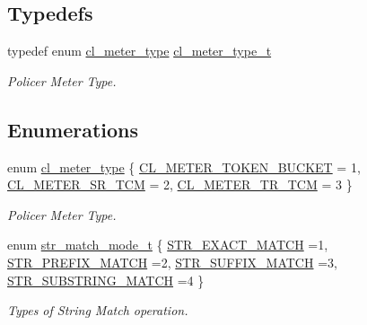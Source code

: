 \subsection*{Typedefs}
\begin{DoxyCompactItemize}
\item 
\hypertarget{group__FAPI__QOS__CLASS_ga320ad61e79289091e97378966fb083b3}{typedef enum \hyperlink{group__FAPI__QOS__CLASS_ga8cedc303de33c7b80f5f7ad0b93e360a}{cl\-\_\-meter\-\_\-type} \hyperlink{group__FAPI__QOS__CLASS_ga320ad61e79289091e97378966fb083b3}{cl\-\_\-meter\-\_\-type\-\_\-t}}\label{group__FAPI__QOS__CLASS_ga320ad61e79289091e97378966fb083b3}

\begin{DoxyCompactList}\small\item\em Policer Meter Type. \end{DoxyCompactList}\end{DoxyCompactItemize}
\subsection*{Enumerations}
\begin{DoxyCompactItemize}
\item 
enum \hyperlink{group__FAPI__QOS__CLASS_ga8cedc303de33c7b80f5f7ad0b93e360a}{cl\-\_\-meter\-\_\-type} \{ \hyperlink{group__FAPI__QOS__CLASS_gga8cedc303de33c7b80f5f7ad0b93e360aa340459b223cd6b47515d690fe34aa84b}{C\-L\-\_\-\-M\-E\-T\-E\-R\-\_\-\-T\-O\-K\-E\-N\-\_\-\-B\-U\-C\-K\-E\-T} = 1, 
\hyperlink{group__FAPI__QOS__CLASS_gga8cedc303de33c7b80f5f7ad0b93e360aae660340dc4cec61c4d5b8f4943aadd23}{C\-L\-\_\-\-M\-E\-T\-E\-R\-\_\-\-S\-R\-\_\-\-T\-C\-M} = 2, 
\hyperlink{group__FAPI__QOS__CLASS_gga8cedc303de33c7b80f5f7ad0b93e360aa89493bbc9c0343b2353da7098a75ff6e}{C\-L\-\_\-\-M\-E\-T\-E\-R\-\_\-\-T\-R\-\_\-\-T\-C\-M} = 3
 \}
\begin{DoxyCompactList}\small\item\em Policer Meter Type. \end{DoxyCompactList}\item 
enum \hyperlink{group__FAPI__QOS__CLASS_ga002c716c5dae6e4be5433e1f11659cdb}{str\-\_\-match\-\_\-mode\-\_\-t} \{ \hyperlink{group__FAPI__QOS__CLASS_gga002c716c5dae6e4be5433e1f11659cdbab938decc748980dc815bfdc9214c8b23}{S\-T\-R\-\_\-\-E\-X\-A\-C\-T\-\_\-\-M\-A\-T\-C\-H} =1, 
\hyperlink{group__FAPI__QOS__CLASS_gga002c716c5dae6e4be5433e1f11659cdba326a87c36b59443443c5e9b8992dd7b9}{S\-T\-R\-\_\-\-P\-R\-E\-F\-I\-X\-\_\-\-M\-A\-T\-C\-H} =2, 
\hyperlink{group__FAPI__QOS__CLASS_gga002c716c5dae6e4be5433e1f11659cdba3c41c7b874c32b9510a6e71f183ddf42}{S\-T\-R\-\_\-\-S\-U\-F\-F\-I\-X\-\_\-\-M\-A\-T\-C\-H} =3, 
\hyperlink{group__FAPI__QOS__CLASS_gga002c716c5dae6e4be5433e1f11659cdba837cc902e460a3cbf5cdee1d11054b99}{S\-T\-R\-\_\-\-S\-U\-B\-S\-T\-R\-I\-N\-G\-\_\-\-M\-A\-T\-C\-H} =4
 \}
\begin{DoxyCompactList}\small\item\em Types of String Match operation. \end{DoxyCompactList}\end{DoxyCompactItemize}
